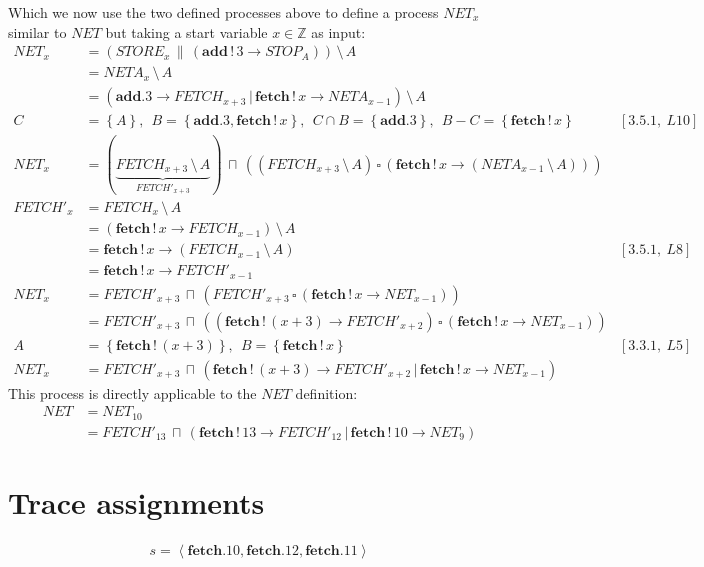 \documentclass[11pt,a4paper]{article}
\def\ra{\rightarrow}
\def\cc{\,\|\,}
\def\gc{\,\square\,}
\def\ch{\,|\,}
\def\ic{\,\sqcap\,}
\def\hide{\,\setminus\,}
\def\wr{\,!\,}
\newcommand{\chan}[1]{\textbf{#1}}
\newcommand{\ab}[1]{\left \langle #1 \right \rangle}
\newcommand{\sN}[1]{\left \lbrace #1 \right \rbrace}
\begin{document}
Which we now use the two defined processes above to define a process $NET_x$
similar to $NET$ but taking a start variable $x \in \mathbb{Z}$ as input:
\begin{align*}
    NET_x &=(STORE_x \cc (\chan{add} \wr 3 \ra STOP_A)) \hide A \\
        &= NETA_x \hide A \\
        &= (\chan{add}.3 \ra FETCH_{x+3} \ch \chan{fetch}\wr x \ra NETA_{x-1})
        \hide A \\
        C &= \sN{A},~~ B = \sN{\chan{add}.3, \chan{fetch}\wr x},~~
        C \cap B = \sN{\chan{add}.3},~~B - C = \sN{\chan{fetch}\wr x}
            & [3.5.1,~L10] \\
    NET_x &= (\underbrace{FETCH_{x+3} \hide A}_{FETCH'_{x+3}}) \ic
            ((FETCH_{x+3} \hide A) \gc
            (\chan{fetch}\wr x \ra (NETA_{x-1} \hide A)
            )) & \\
    FETCH'_{x} &= FETCH_x \hide A \\
               &= (\chan{fetch}\wr x \ra FETCH_{x-1}) \hide A \\
               &= \chan{fetch} \wr x \ra (FETCH_{x-1} \hide A) & [3.5.1,~L8] \\
               &= \chan{fetch} \wr x \ra FETCH'_{x-1} \\
    NET_x &= FETCH'_{x+3} \ic
             (FETCH'_{x+3} \gc
              (\chan{fetch}\wr x \ra NET_{x-1}
             )) & \\
          &= FETCH'_{x+3} \ic
             ((\chan{fetch} \wr (x+3) \ra FETCH'_{x+2}) \gc
              (\chan{fetch}\wr x \ra NET_{x-1}
             )) & \\
    A &= \sN{\chan{fetch} \wr (x+3)},~~ B = \sN{\chan{fetch} \wr x} &
            [3.3.1,~L5] \\
    NET_x &= FETCH'_{x+3} \ic
             (\chan{fetch} \wr (x+3) \ra FETCH'_{x+2} \ch
              \chan{fetch} \wr x \ra NET_{x-1}
             )
\end{align*}
This process is directly applicable to the $NET$ definition:
\begin{align*}
    NET &= NET_{10} \\
        &= FETCH'_{13} \ic (\chan{fetch}\wr 13 \ra FETCH'_{12} \ch
            \chan{fetch}\wr 10 \ra NET_{9})
\end{align*}


\section{Trace assignments}
\begin{align*}
    s = \ab{ \chan{fetch}.10, \chan{fetch}.12, \chan{fetch}.11}
\end{align*}
\end{document}
